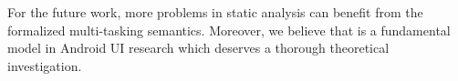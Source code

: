 \documentclass[acmsmall,manuscript,screen,review]{acmart}
\begin{document}

For the future work, more problems in static analysis %
can benefit from the formalized multi-tasking semantics. 
Moreover, we believe that {\AMASS} is a fundamental model in Android UI research which deserves a thorough theoretical investigation.



\newpage
\appendix

\end{document}
